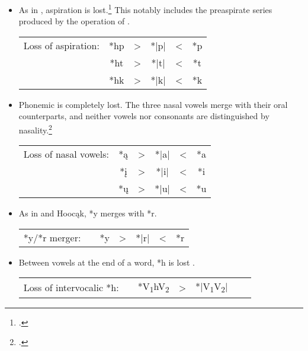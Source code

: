 \documentclass[output=paper]{LSP/langsci}
\begin{document}
\begin{itemize}
\item As in ,  aspiration is lost.\footnote{\citealt[50, 85]{Rankinetal2006PDF}.} This notably includes the preaspirate series produced by the operation of .

				
\begin{tabular}[t]{c c c c c c }
Loss of aspiration: & *hp & > & *|p|	& < & 	*p \\
& *ht	 & > & *|t|	& <	 & *t \\
& *hk & > & *|k|	 & < & *k \\
\end{tabular}

\item Phonemic  is completely lost.  The three  nasal vowels merge with their oral counterparts, and neither vowels nor consonants are distinguished by nasality.\footnote{\citealt[109]{Rankinetal2006PDF}.}


\begin{tabular}[t]{c c c c c c }
Loss of nasal vowels: &	*\k{a} & >	& *|a| & < & *a \\
& *\k{i} & > & *|i| & < & *i \\
& *\k{u} & > & *|u| & < & *u \\
\end{tabular}

\item As in  and Hooc\k{a}k,  *y merges with *r.



\begin{tabular}[t]{c c c c c c c}
*y/*r merger: & & *y	 & >  & *|r| &  <	 & *r 
\end{tabular}

\item Between vowels at the end of a word, *h is lost .



\begin{tabular}[t]{c c c c c c c}
Loss of intervocalic *h: & & *V\textsubscript{1}hV\textsubscript{2} & > & *|V\textsubscript{1}V\textsubscript{2}|	
\end{tabular}


\end{itemize}
\end{document}
